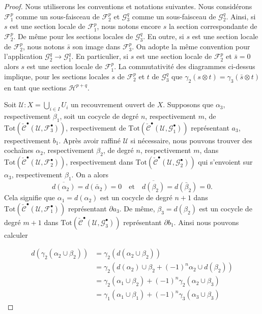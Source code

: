 \begin{proof}

Nous utiliserons les conventions et notations suivantes. Nous considérons
${\mathcal F}_1^p$ comme un sous-faisceau de ${\mathcal F}_2^p$ et
${\mathcal G}_3^q$ comme un sous-faisceau de ${\mathcal G}_2^q$. Ainsi, si $s$ est une section locale de ${\mathcal F}_1^p$, nous notons encore $s$ la section correspondante de ${\mathcal F}_2^p$. De même pour les sections locales de ${\mathcal G}_3^q$. En outre, si $s$ est une section locale de ${\mathcal F}_2^p$, nous notons
$\bar s$ son image dans ${\mathcal F}_3^p$. On adopte la même convention pour l'application ${\mathcal G}_2^q \to {\mathcal G}^q_1$. En particulier, si
$s$ est une section locale de ${\mathcal F}_2^p$ et $\bar s = 0$
alors $s$ est une section locale de ${\mathcal F}_1^p$. La commutativité des diagrammes ci-dessus implique, pour les sections locales $s$ de
${\mathcal F}_2^p$ et $t$ de ${\mathcal G}_3^q$ que
$\gamma_2(s \otimes t) = \gamma_3(\bar s \otimes t)$ en tant que sections
${\mathcal H}^{p + q}$.

\medskip\noindent

Soit ${\mathcal U} : X =  \bigcup_{i \in I} U_i$ un recouvrement ouvert de $X$. Supposons que $\alpha_3$, respectivement $\beta_1$, soit un cocycle de degré $n$, respectivement $m$, de
$\text{Tot}(
\check{\mathcal{C}}^\bullet({\mathcal U}, {\mathcal F}_3^\bullet))$, respectivement de $\text{Tot}(
\check{\mathcal{C}}^\bullet({\mathcal U}, {\mathcal G}_1^\bullet))$
représentant $a_3$, respectivement $b_1$. Après avoir raffiné $\mathcal{U}$ si nécessaire, nous pouvons trouver des cochaînes $\alpha_2$, respectivement $\beta_2$, de degré $n$, respectivement $m$, dans
$\text{Tot}(
\check{\mathcal{C}}^\bullet({\mathcal U}, {\mathcal F}_2^\bullet))$, respectivement dans $\text{Tot}(
\check{\mathcal{C}}^\bullet({\mathcal U}, {\mathcal G}_2^\bullet))$
qui s'envoient sur $\alpha_3$, respectivement $\beta_1$. On a alors
$$
\overline{d(\alpha_2)} = d(\bar \alpha_2) = 0
\quad\text{et}\quad
\overline{d(\beta_2)} = d(\bar \beta_2) = 0.
$$
Cela signifie que $\alpha_1 = d(\alpha_2)$ est un cocycle de degré $n + 1$ dans
$\text{Tot}(\check{\mathcal{C}}^\bullet({\mathcal U}, {\mathcal F}_1^\bullet))$
représentant $\partial a_3$. De même, $\beta_3 = d(\beta_2)$ est un cocycle de degré $m + 1$ dans
$\text{Tot}(\check{\mathcal{C}}^\bullet({\mathcal U}, {\mathcal G}_3^\bullet))$
représentant $\partial b_1$. Ainsi nous pouvons calculer

\begin{align*}
d(\gamma_2(\alpha_2 \cup \beta_2))
& =
\gamma_2(d(\alpha_2 \cup \beta_2))
\\
& =
\gamma_2(d(\alpha_2) \cup \beta_2 + (-1)^n \alpha_2 \cup d(\beta_2) )
\\
& =
\gamma_2( \alpha_1 \cup \beta_2)  + (-1)^n \gamma_2( \alpha_2 \cup \beta_3)
\\
& =
\gamma_1(\alpha_1 \cup \beta_1) + (-1)^n \gamma_3(\alpha_3 \cup \beta_3)
\end{align*}


\end{proof}

